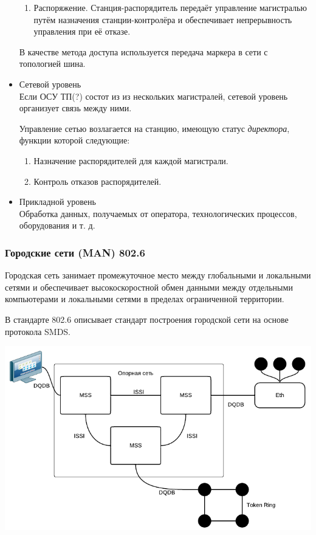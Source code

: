 \documentclass[12pt, russian, oneside, article]{ncc}
\begin{document}
\begin{itemize}
\begin{enumerate}
\item Распоряжение. Станция-распорядитель передаёт управление магистралью путём назначения станции-контролёра и обеспечивает непрерывность управления при её отказе.
\end{enumerate}

В качестве метода доступа используется передача маркера в сети с топологией шина.


\item Сетевой уровень\\
\label{sec-5_2_3_4}%
Если ОСУ ТП(?) состот из из нескольких магистралей, сетевой уровень организует связь между ними.

Управление сетью возлагается на станцию, имеющую статус \emph{директора}, функции которой следующие:
\begin{enumerate}
\item Назначение распорядителей для каждой магистрали.
\item Контроль отказов распорядителей.
\end{enumerate}


\item Прикладной уровень\\
\label{sec-5_2_3_5}%
Обработка данных, получаемых от оператора, технологических процессов, оборудования и т. д.

\end{itemize} %
\subsubsection{Городские сети (MAN) 802.6}
\label{sec-5_2_4}


Городская сеть занимает промежуточное место между глобальными и локальными сетями и обеспечивает высокоскоростной обмен данными между отдельными компьютерами и локальными сетями в пределах ограниченной территории.

В стандарте 802.6 описывает стандарт построения городской сети на основе протокола SMDS.

\includegraphics[]{images/SiSPI/man.png}
\end{document}
